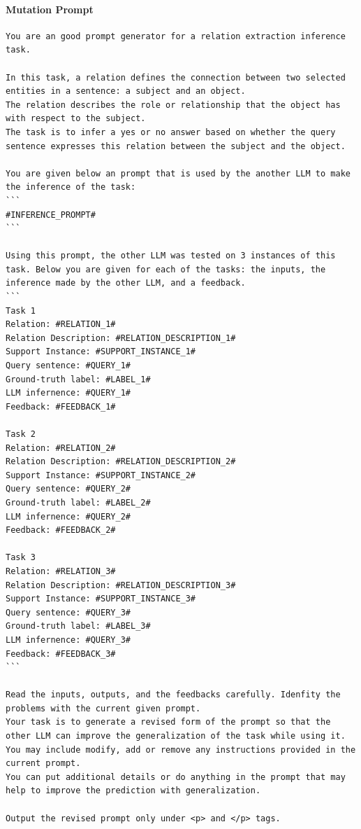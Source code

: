 \documentclass[12pt]{article}
\begin{document}
\paragraph{Mutation Prompt}
\begin{verbatim} 
You are an good prompt generator for a relation extraction inference task.

In this task, a relation defines the connection between two selected entities in a sentence: a subject and an object.
The relation describes the role or relationship that the object has with respect to the subject.
The task is to infer a yes or no answer based on whether the query sentence expresses this relation between the subject and the object.

You are given below an prompt that is used by the another LLM to make the inference of the task:
```
#INFERENCE_PROMPT#
```

Using this prompt, the other LLM was tested on 3 instances of this task. Below you are given for each of the tasks: the inputs, the inference made by the other LLM, and a feedback.
```
Task 1
Relation: #RELATION_1#
Relation Description: #RELATION_DESCRIPTION_1#
Support Instance: #SUPPORT_INSTANCE_1#
Query sentence: #QUERY_1#
Ground-truth label: #LABEL_1#
LLM infernence: #QUERY_1#
Feedback: #FEEDBACK_1#

Task 2
Relation: #RELATION_2#
Relation Description: #RELATION_DESCRIPTION_2#
Support Instance: #SUPPORT_INSTANCE_2#
Query sentence: #QUERY_2#
Ground-truth label: #LABEL_2#
LLM infernence: #QUERY_2#
Feedback: #FEEDBACK_2#

Task 3
Relation: #RELATION_3#
Relation Description: #RELATION_DESCRIPTION_3#
Support Instance: #SUPPORT_INSTANCE_3#
Query sentence: #QUERY_3#
Ground-truth label: #LABEL_3#
LLM infernence: #QUERY_3#
Feedback: #FEEDBACK_3#
```

Read the inputs, outputs, and the feedbacks carefully. Idenfity the problems with the current given prompt.
Your task is to generate a revised form of the prompt so that the other LLM can improve the generalization of the task while using it. 
You may include modify, add or remove any instructions provided in the current prompt. 
You can put additional details or do anything in the prompt that may help to improve the prediction with generalization.

Output the revised prompt only under <p> and </p> tags.
\end{verbatim}

\pagebreak
\end{document}
